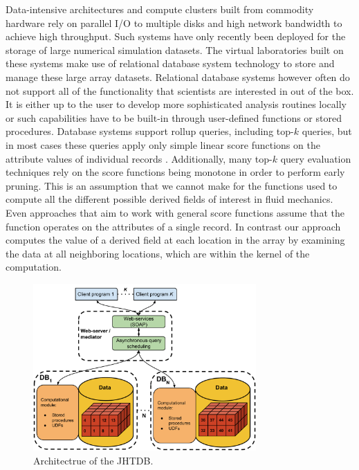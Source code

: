 \documentclass{sig-alternate}
\begin{document}
Data-intensive architectures and compute clusters built from commodity hardware rely on parallel I/O to multiple disks and high network bandwidth
to achieve high throughput. Such systems have only recently been deployed for the storage of large numerical simulation 
datasets. The virtual laboratories built on these systems make use of relational database system technology to store and manage these large array datasets.
Relational database systems however often do not support
all of the functionality that scientists are interested in out of the box. It is either up to the user to develop more sophisticated analysis routines locally or such
capabilities have to be built-in through user-defined functions or stored procedures. 
Database systems support rollup queries, including top-$k$ queries, but in most cases these
queries apply only simple linear score functions on the attribute values of individual records \cite{Ilyas}.
Additionally, many top-$k$ query evaluation techniques rely on the score functions being monotone in order to perform early pruning.
This is an assumption that we cannot make for the functions used to compute all the different possible derived fields of interest in fluid mechanics.
Even approaches that aim to work with general score functions \cite{Deshpande, Xin} assume that the function operates on the attributes of a single record.
In contrast our approach computes the value of a derived field at each location in the array by examining the data at all neighboring locations, which
are within the kernel of the computation. 

\begin{figure}
\centering
\includegraphics[width=3.35in]{Figures/jhtdb_diagram.pdf}
\caption{Architectrue of the JHTDB.}
\label{fig:jhtdb_diagram}
\end{figure}
\end{document}
